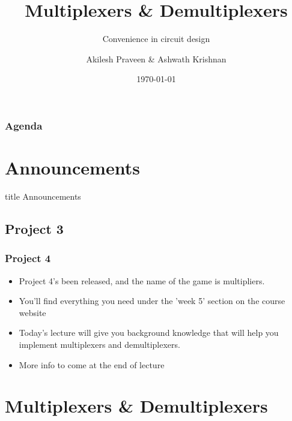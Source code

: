 \documentclass{beamer}
\title{Multiplexers \& Demultiplexers}
\subtitle{Convenience in circuit design}
\author[A Praveen \& A Krishnan]{Akilesh Praveen \& Ashwath Krishnan}
\institute{UMD}
\date{\today}
\begin{document}
    \begin{frame}
        \titlepage
    \end{frame}
    
    \begin{frame}
        \frametitle{Agenda}
        \tableofcontents
    \end{frame}
    
    \section{Announcements}
    
        \begin{frame}
                \vfill
                \centering
                \begin{beamercolorbox}[sep=8pt,center,shadow=true,rounded=true]{title}
                    Announcements\par%
                \end{beamercolorbox}
                \vfill
             \end{frame}
    
        \subsection{Project 3}
        
            
            
            \begin{frame}
                \frametitle{Project 4}
                \begin{itemize}
                    \item Project 4's been released, and the name of the game is multipliers.
                    \item You'll find everything you need under the 'week 5' section on the course website
                    \item Today's lecture will give you background knowledge that will help you implement multiplexers and demultiplexers.
                    
                    \item More info to come at the end of lecture
                    
                \end{itemize}
            \end{frame}
            
    \section{Multiplexers \& Demultiplexers}
    
\end{document}
